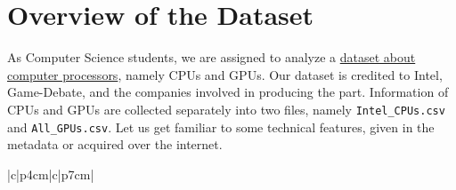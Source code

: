 \chapter{Overview of the Dataset}

As Computer Science students, we are assigned to analyze a \href{https://www.kaggle.com/datasets/iliassekkaf/computerparts/data}{dataset about computer processors}, namely CPUs and GPUs. Our dataset is credited to Intel, Game-Debate, and the companies involved in producing the part. Information of CPUs and GPUs are collected separately into two files, namely \texttt{Intel\_CPUs.csv} and \texttt{All\_GPUs.csv}. Let us get familiar to some technical features, given in the metadata or acquired over the internet.

\begin{center}
  \begin{longtblr}[caption={Some technical features of CPUs and GPUs}]{|c|p{4cm}|c|p{7cm}|}


\end{longtblr}
\end{center}
